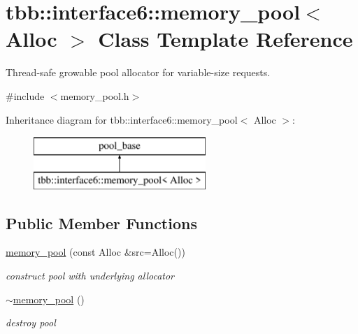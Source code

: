 \hypertarget{classtbb_1_1interface6_1_1memory__pool}{}\section{tbb\+:\+:interface6\+:\+:memory\+\_\+pool$<$ Alloc $>$ Class Template Reference}
\label{classtbb_1_1interface6_1_1memory__pool}


Thread-\/safe growable pool allocator for variable-\/size requests.  




{\ttfamily \#include $<$memory\+\_\+pool.\+h$>$}

Inheritance diagram for tbb\+:\+:interface6\+:\+:memory\+\_\+pool$<$ Alloc $>$\+:\begin{figure}[H]
\begin{center}
\leavevmode
\includegraphics[height=2.000000cm]{classtbb_1_1interface6_1_1memory__pool}
\end{center}
\end{figure}
\subsection*{Public Member Functions}
\begin{DoxyCompactItemize}
\item 
\hypertarget{classtbb_1_1interface6_1_1memory__pool_af4c36829a159eac04d630ac5a99b9354}{}\hyperlink{classtbb_1_1interface6_1_1memory__pool_af4c36829a159eac04d630ac5a99b9354}{memory\+\_\+pool} (const Alloc \&src=Alloc())\label{classtbb_1_1interface6_1_1memory__pool_af4c36829a159eac04d630ac5a99b9354}

\begin{DoxyCompactList}\small\item\em construct pool with underlying allocator \end{DoxyCompactList}\item 
\hypertarget{classtbb_1_1interface6_1_1memory__pool_ad2c7645b39b7280b1b3cf393d05fbaf7}{}\hyperlink{classtbb_1_1interface6_1_1memory__pool_ad2c7645b39b7280b1b3cf393d05fbaf7}{$\sim$memory\+\_\+pool} ()\label{classtbb_1_1interface6_1_1memory__pool_ad2c7645b39b7280b1b3cf393d05fbaf7}

\begin{DoxyCompactList}\small\item\em destroy pool \end{DoxyCompactList}\end{DoxyCompactItemize}


